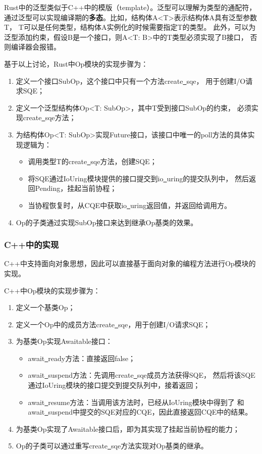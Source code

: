\documentclass[supercite]{HustGraduPaper}
\theoremstyle{definition}
\begin{document}
Rust中的泛型类似于C++中的模版（template）。泛型可以理解为类型的通配符，
通过泛型可以实现编译期的\textbf{多态}。比如，结构体A<T>表示结构体A具有泛型参数T，
T可以是任何类型，结构体A实例化的时候需要指定T的类型。
此外，可以为泛型添加约束，假设B是一个接口，则A<T: B>中的T类型必须实现了B接口，
否则编译器会报错。\par

基于以上讨论，Rust中Op模块的实现步骤为：

\begin{enumerate}
  \item 定义一个接口SubOp，这个接口中只有一个方法create\underline{~}sqe，
    用于创建I/O请求SQE；
  \item 定义一个泛型结构体Op<T: SubOp>，其中T受到接口SubOp的约束，
    必须实现create\underline{~}sqe方法；
  \item 为结构体Op<T: SubOp>实现Future接口，该接口中唯一的poll方法的具体实现逻辑为：
    \begin{itemize}
      \item 调用类型T的create\underline{~}sqe方法，创建SQE；
      \item 将SQE通过IoUring模块提供的接口提交到io\underline{~}uring的提交队列中，
        然后返回Pending，挂起当前协程；
      \item 当协程恢复时，从CQE中获取io\underline{~}uring返回值，并返回给调用方。
    \end{itemize}
  \item Op的子类通过实现SubOp接口来达到继承Op基类的效果。
\end{enumerate}

\subsubsection{C++中的实现}

C++中支持面向对象思想，因此可以直接基于面向对象的编程方法进行Op模块的实现。\par

C++中Op模块的实现步骤为：

\begin{enumerate}
  \item 定义一个基类Op；
  \item 定义一个Op中的成员方法create\underline{~}sqe，用于创建I/O请求SQE；
  \item 为基类Op实现Awaitable接口：
    \begin{itemize}
      \item await\underline{~}ready方法：直接返回false；
      \item await\underline{~}suspend方法：先调用create\underline{~}sqe成员方法获得SQE，
        然后将该SQE通过IoUring模块的接口提交到提交队列中，接着返回；
      \item await\underline{~}resume方法：当调用该方法时，已经从IoUring模块中得到了
        和await\underline{~}suspend中提交的SQE对应的CQE，因此直接返回CQE中的结果。
    \end{itemize}
  \item 为基类Op实现了Awaitable接口后，即为其实现了挂起当前协程的能力；
  \item Op的子类可以通过重写create\underline{~}sqe方法实现对Op基类的继承。
\end{enumerate}
\end{document}

